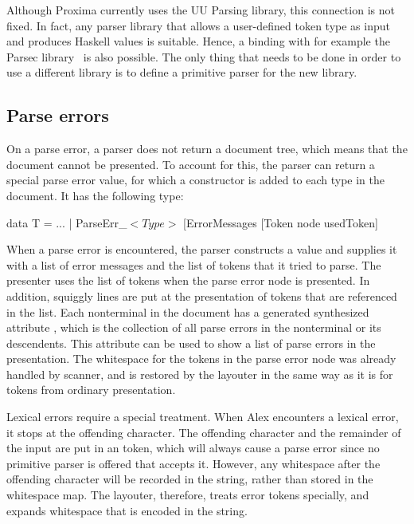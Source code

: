 \documentclass[12pt]{article}
\begin{document}
Although Proxima currently uses the UU Parsing library, this connection is not fixed. In fact, any  parser library that allows a user-defined token type as input and produces Haskell values is suitable. Hence, a binding with for example the Parsec library~\cite{leijen08parsec} is also possible. The only thing that needs to be done in order to use a different library is to define a primitive parser  for the new library.


\subsection{Parse errors} \label{sect:parseScanErrors}

On a parse error, a parser does not return a document tree, which means that the document cannot be presented. To account for this, the parser can return a special parse error value, for which a constructor is added to each type in the document. It has the following type:

\begin{footnotesize}
\begin{tabbedCode}
data T =
  ...
  | ParseErr\_$<Type>$ [ErrorMessages [Token node usedToken] 
\end{tabbedCode}
\end{footnotesize}

When a parse error is encountered, the parser constructs a  value and supplies it with a list of error messages and the list of tokens that it tried to parse. The presenter uses the list of tokens when the parse error node is presented. In addition, squiggly lines are put at the presentation of tokens that are referenced in the  list. Each nonterminal in the document has a generated synthesized attribute , which is the collection of all parse errors in the nonterminal or its descendents. This attribute can be used to show a list of parse errors in the presentation. The whitespace for the tokens in the parse error node was already handled by scanner, and is restored by the layouter in the same way as it is for tokens from ordinary presentation.


Lexical errors require a special treatment. When Alex encounters a lexical error, it stops at the offending character. The offending character and the remainder of the input are put in an  token, which will always cause a parse error since no primitive parser is offered that accepts it. However, any whitespace after the offending character will be recorded in the string, rather than stored in the whitespace map. The layouter, therefore, treats error tokens specially, and expands whitespace that is encoded in the string. 
\end{document}
